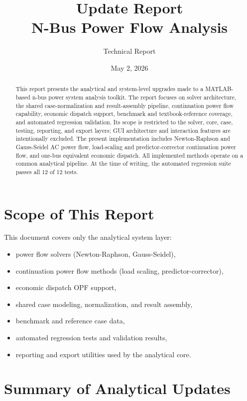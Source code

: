 \documentclass[12pt,a4paper]{article}
\title{\textbf{Update Report}\\
\large N-Bus Power Flow Analysis}
\author{Technical Report}
\date{May 2, 2026}
\begin{document}
\maketitle

\begin{abstract}
This report presents the analytical and system-level upgrades made to a MATLAB-based n-bus power system analysis toolkit. The report focuses on solver architecture, the shared case-normalization and result-assembly pipeline, continuation power flow capability, economic dispatch support, benchmark and textbook-reference coverage, and automated regression validation. Its scope is restricted to the solver, core, case, testing, reporting, and export layers; GUI architecture and interaction features are intentionally excluded. The present implementation includes Newton-Raphson and Gauss-Seidel AC power flow, load-scaling and predictor-corrector continuation power flow, and one-bus equivalent economic dispatch. All implemented methods operate on a common analytical pipeline. At the time of writing, the automated regression suite passes all 12 of 12 tests.
\end{abstract}

\section{Scope of This Report}

This document covers only the analytical system layer:
\begin{itemize}[leftmargin=1.5em]
    \item power flow solvers (Newton-Raphson, Gauss-Seidel),
    \item continuation power flow methods (load scaling, predictor-corrector),
    \item economic dispatch OPF support,
    \item shared case modeling, normalization, and result assembly,
    \item benchmark and reference case data,
    \item automated regression tests and validation results,
    \item reporting and export utilities used by the analytical core.
\end{itemize}
\newpage


\section{Summary of Analytical Updates}
\end{document}
